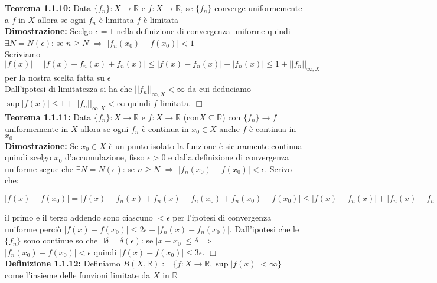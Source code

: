 \documentclass[a4paper,11pt,titlepage]{book}
\begin{document}
\textbf{Teorema 1.1.10:} Data $\{f_{n}\}:X\rightarrow\mathbb{R}$ e $f:X\rightarrow\mathbb{R}$, se $\{f_{n}\}$ converge uniformemente a $f$ in $X$ allora se ogni $f_{n}$ è limitata $f$ è limitata\\

\textbf{Dimostrazione:} Scelgo $\epsilon =1$ nella definizione di convergenza uniforme  quindi $\exists{N}=N(\epsilon)$: se $n\geq{N}$ $\Rightarrow$ $|f_{n}(x_{0})-f(x_{0})|<1$\\

Scriviamo $|f(x)|=|f(x)-f_{n}(x)+f_{n}(x)|\leq |f(x)-f_{n}(x)|+|f_{n}(x)|\leq 1+||f_{n}||_{\infty,X}$ per la nostra scelta fatta su $\epsilon$\\

Dall'ipotesi di limitatezza si ha che $||f_{n}||_{\infty,X}<\infty$ da cui deduciamo $\sup |f(x)|\leq 1+||f_{n}||_{\infty,X}<\infty$ quindi $f$ limitata. $\Box$ \\

\textbf{Teorema 1.1.11:} Data $\{f_{n}\}:X\rightarrow\mathbb{R}$ e $f:X\rightarrow\mathbb{R}$ (con$X\subseteq \mathbb{R}$) con $\{f_{n}\}\rightarrow f$ uniformemente in $X$ allora se ogni $f_{n}$ è continua in $x_0 \in X$ anche $f$ è continua in $x_0$\\

\textbf{Dimostrazione:} Se $x_0 \in X$ è un punto isolato la funzione è sicuramente continua quindi scelgo $x_0$ d'accumulazione, fisso $\epsilon >0$ e dalla definizione di convergenza uniforme segue che $\exists{N}=N(\epsilon)$: se $n\geq{N}$ $\Rightarrow$ $|f_{n}(x_{0})-f(x_{0})|<\epsilon$. Scrivo che:

\begin{center}
$|f(x)-f(x_0)|=|f(x)-f_{n}(x)+f_{n}(x)-f_{n}(x_{0})+f_{n}(x_{0})-f(x_0)|\leq
|f(x)-f_{n}(x)|+|f_{n}(x)-f_{n}(x_{0})|+|f_{n}(x_{0})-f(x_0)|$
\end{center}
 il primo e il terzo addendo sono ciascuno $<\epsilon$ per l'ipotesi di convergenza uniforme perciò $|f(x)-f(x_0)|\leq 2\epsilon+|f_{n}(x)-f_{n}(x_{0})|$.
Dall'ipotesi che le $\{f_{n}\}$ sono continue so che $\exists{\delta}=\delta(\epsilon)$: se $|x-x_0|\leq{\delta}$ $\Rightarrow$ $|f_{n}(x_{0})-f(x_{0})|<\epsilon$ quindi $|f(x)-f(x_0)|\leq 3\epsilon$. $\Box$ \\

\textbf{Definizione 1.1.12:} Definiamo $B(X,\mathbb{R}):=\{f:X\rightarrow\mathbb{R},\sup |f(x)|<\infty\}$ come l'insieme delle funzioni limitate da $X$ in $\mathbb{R}$ \\
\end{document}
